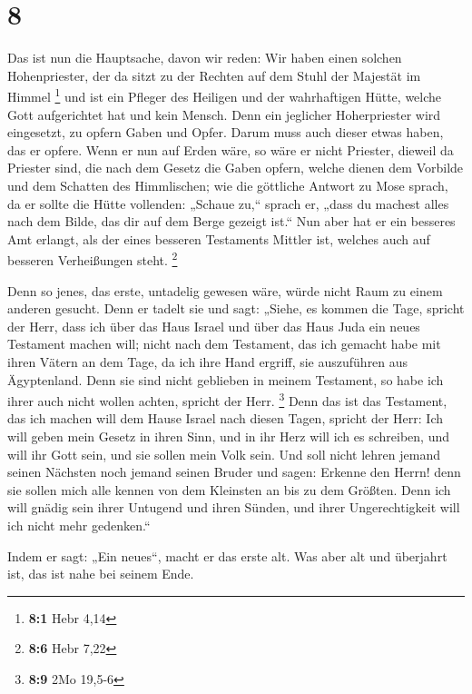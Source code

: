 \hypertarget{section-7}{%
\section{8}\label{section-7}}

 Das ist nun die Hauptsache, davon wir reden: Wir haben
einen solchen Hohenpriester, der da sitzt zu der Rechten auf dem Stuhl
der Majestät im Himmel \footnote{\textbf{8:1} Hebr 4,14} 
und ist ein Pfleger des Heiligen und der wahrhaftigen Hütte, welche Gott
aufgerichtet hat und kein Mensch.  Denn ein jeglicher
Hoherpriester wird eingesetzt, zu opfern Gaben und Opfer. Darum muss
auch dieser etwas haben, das er opfere.  Wenn er nun auf
Erden wäre, so wäre er nicht Priester, dieweil da Priester sind, die
nach dem Gesetz die Gaben opfern,  welche dienen dem
Vorbilde und dem Schatten des Himmlischen; wie die göttliche Antwort zu
Mose sprach, da er sollte die Hütte vollenden: „Schaue zu,`` sprach er,
„dass du machest alles nach dem Bilde, das dir auf dem Berge gezeigt
ist.``  Nun aber hat er ein besseres Amt erlangt, als der
eines besseren Testaments Mittler ist, welches auch auf besseren
Verheißungen steht. \footnote{\textbf{8:6} Hebr 7,22}

 Denn so jenes, das erste, untadelig gewesen wäre, würde
nicht Raum zu einem anderen gesucht.  Denn er tadelt sie
und sagt: „Siehe, es kommen die Tage, spricht der Herr, dass ich über
das Haus Israel und über das Haus Juda ein neues Testament machen will;
 nicht nach dem Testament, das ich gemacht habe mit ihren
Vätern an dem Tage, da ich ihre Hand ergriff, sie auszuführen aus
Ägyptenland. Denn sie sind nicht geblieben in meinem Testament, so habe
ich ihrer auch nicht wollen achten, spricht der Herr. \footnote{\textbf{8:9}
  2Mo 19,5-6}  Denn das ist das Testament, das ich machen
will dem Hause Israel nach diesen Tagen, spricht der Herr: Ich will
geben mein Gesetz in ihren Sinn, und in ihr Herz will ich es schreiben,
und will ihr Gott sein, und sie sollen mein Volk sein. 
Und soll nicht lehren jemand seinen Nächsten noch jemand seinen Bruder
und sagen: Erkenne den Herrn! denn sie sollen mich alle kennen von dem
Kleinsten an bis zu dem Größten.  Denn ich will gnädig
sein ihrer Untugend und ihren Sünden, und ihrer Ungerechtigkeit will ich
nicht mehr gedenken.``

 Indem er sagt: „Ein neues``, macht er das erste alt. Was
aber alt und überjahrt ist, das ist nahe bei seinem Ende.


